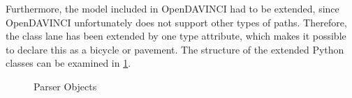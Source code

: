 \documentclass[11pt,oneside,openright]{mpreport}
\begin{document}
Furthermore, the model included in OpenDAVINCI had to be extended, since OpenDAVINCI unfortunately does not support other types of paths.
Therefore, the class lane has been extended by one type attribute, which makes it possible to declare this as a bicycle or pavement.
The structure of the extended Python classes can be examined in \cref{parer_objects}.

\begin{figure}[!ht]
\begin{center}
\caption{Parser Objects}
\label{parer_objects}
\end{center}
\end{figure}


% 
\end{document}

